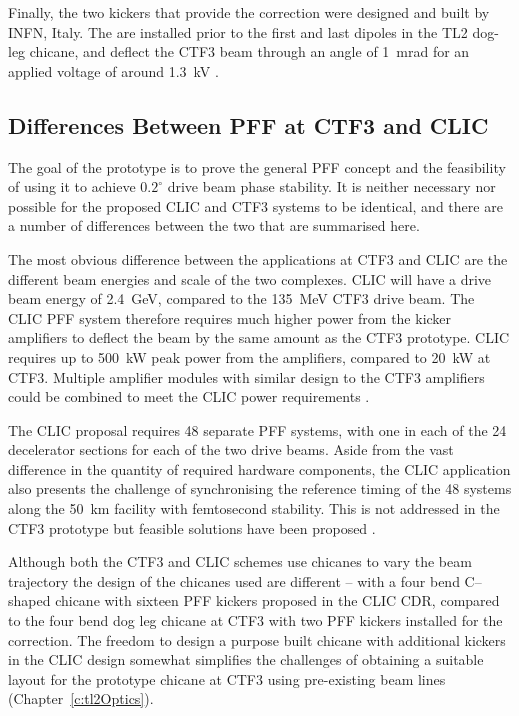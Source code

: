 Finally, the two kickers that provide the correction were designed and built by INFN, Italy. The are installed prior to the first and last dipoles in the TL2 dog-leg chicane, and deflect the CTF3 beam through an angle of 1~mrad for an applied voltage of around 1.3~kV \cite{kickerIPAC11}.


\subsection{Differences Between PFF at CTF3 and CLIC}
\label{ss:ctfVsCLIC}

The goal of the prototype is to prove the general PFF concept and the feasibility of using it to achieve \(0.2^\circ\) drive beam phase stability. It is neither necessary nor possible for the proposed CLIC and CTF3 systems to be identical, and there are a number of differences between the two that are summarised here. 

The most obvious difference between the applications at CTF3 and CLIC are the different beam energies and scale of the two complexes. CLIC will have a drive beam energy of 2.4~GeV, compared to the 135~MeV CTF3 drive beam. The CLIC PFF system therefore requires much higher power from the kicker amplifiers to deflect the beam by the same amount as the CTF3 prototype. CLIC requires up to 500~kW peak power from the amplifiers, compared to 20~kW at CTF3. Multiple amplifier modules with similar design to the CTF3 amplifiers could be combined to meet the CLIC power requirements \cite{colinCLIC16}.

The CLIC proposal requires 48 separate PFF systems, with one in each of the 24 decelerator sections for each of the two drive beams. Aside from the vast difference in the quantity of required hardware components, the CLIC application also presents the challenge of synchronising the reference timing of the 48 systems along the 50~km facility with femtosecond stability. This is not addressed in the CTF3 prototype but feasible solutions have been proposed \cite{clicCDR}.

Although both the CTF3 and CLIC schemes use chicanes to vary the beam trajectory the design of the chicanes used are different -- with a four bend C--shaped chicane with sixteen PFF kickers proposed in the CLIC CDR, compared to the four bend dog leg chicane at CTF3 with two PFF kickers installed for the correction. The freedom to design a purpose built chicane with additional kickers in the CLIC design somewhat simplifies the challenges of obtaining a suitable layout for the prototype chicane at CTF3 using pre-existing beam lines (Chapter~\ref{c:tl2Optics}).

